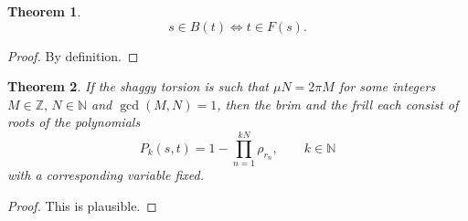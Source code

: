 \documentclass{article}
\theoremstyle{plain}
\newtheorem{theorem}{Theorem}[section]
\theoremstyle{definition}
\begin{document}
    \begin{theorem}
        $$ 
            s \in B(t) \Leftrightarrow t \in F(s)
        .$$
    \end{theorem}
    \begin{proof}
        By definition.
    \end{proof}


    \begin{theorem}
        If the shaggy torsion is such that
        $\mu N = 2\pi M$ for some integers $M \in \mathbb Z,\, N \in \mathbb N$ and  $\gcd(M,N)=1$, then the brim and the frill each consist of roots of the polynomials$$
            P_k(s,t) = 1 - \prod_{n=1}^{kN} \rho_{r_n}, \qquad k \in \mathbb N      
        $$ with a corresponding variable fixed. 
    \end{theorem}
    \begin{proof}
        This is plausible.%
    \end{proof}
\end{document}
